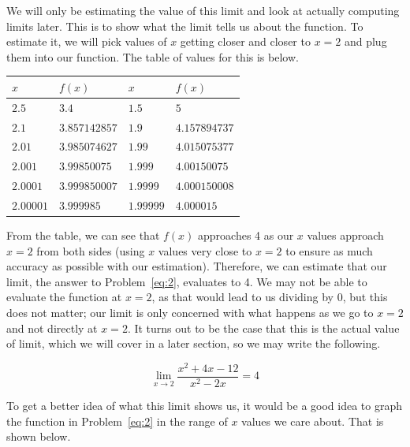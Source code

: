 \documentclass[12pt]{article}
\theoremstyle{definition}
\begin{document}
We will only be estimating the value of this limit and look at actually computing limits later.
This is to show what the limit tells us about the function.
To estimate it, we will pick values of $x$ getting closer and closer to $x=2$ and plug them into our function.
The table of values for this is below.

\begin{table}[h]
    \renewcommand{\arraystretch}{1.5}
    \centering
    \begin{tabular}{>{\centering\arraybackslash}m{1.5cm}|>{\centering\arraybackslash}m{2.5cm}|>{\centering\arraybackslash}m{1.5cm}|>{\centering\arraybackslash}m{2.5cm}}
        $x$       & $f(x)$        & $x$       & $f(x)$        \\ \hline
        $2.5$     & $3.4$         & $1.5$     & $5$           \\
        $2.1$     & $3.857142857$ & $1.9$     & $4.157894737$ \\
        $2.01$    & $3.985074627$ & $1.99$    & $4.015075377$ \\
        $2.001$   & $3.99850075$  & $1.999$   & $4.00150075$  \\
        $2.0001$  & $3.999850007$ & $1.9999$  & $4.000150008$ \\
        $2.00001$ & $3.999985$    & $1.99999$ & $4.000015$
    \end{tabular}
\end{table}

From the table, we can see that $f(x)$ approaches 4 as our $x$ values approach $x=2$ from both sides (using $x$ values very close to $x=2$ to ensure as much accuracy as possible with our estimation).
Therefore, we can estimate that our limit, the answer to Problem~\eqref{eq:2}, evaluates to 4.
We may not be able to evaluate the function at $x=2$, as that would lead to us dividing by 0, but this does not matter; our limit is only concerned with what happens as we go to $x=2$ and not directly at $x=2$.
It turns out to be the case that this is the actual value of limit, which we will cover in a later section, so we may write the following.

\begin{equation}
    \lim_{x \to 2} \frac{x^2+4x-12}{x^2-2x} = 4
\end{equation}

To get a better idea of what this limit shows us, it would be a good idea to graph the function in Problem~\eqref{eq:2} in the range of $x$ values we care about.
That is shown below.
\end{document}
